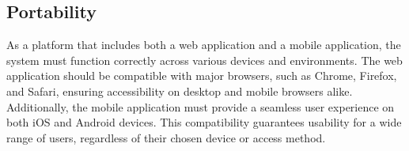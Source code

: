 \subsection{Portability}
\label{subsec: portability}%
As a platform that includes both a web application and a mobile application, the system must function correctly across various devices and environments. The web application should be compatible with major browsers, such as Chrome, Firefox, and Safari, ensuring accessibility on desktop and mobile browsers alike. Additionally, the mobile application must provide a seamless user experience on both iOS and Android devices. This compatibility guarantees usability for a wide range of users, regardless of their chosen device or access method. 